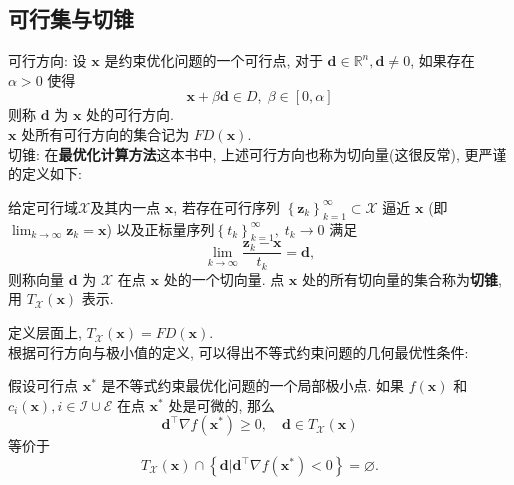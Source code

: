 \documentclass[lang = cn]{elegantpaper}
\begin{document}
\subsection{可行集与切锥}
\noindent
可行方向: 设 $\bm{x}$ 是约束优化问题的一个可行点, 对于 $\bm{d} \in \mathbb{R}^n,\bm{d} \neq 0$, 如果存在 $\alpha > 0$ 使得
\begin{equation*}
    \bm{x} + \beta \bm{d} \in D,\; \beta \in [0,\alpha]
\end{equation*}
则称 $\bm{d}$ 为 $\bm{x}$ 处的可行方向.\\
$\bm{x}$ 处所有可行方向的集合记为 $FD(\bm{x})$.\\
切锥: 在\textbf{最优化计算方法}这本书中, 上述可行方向也称为切向量(这很反常), 更严谨的定义如下:
\begin{definition}
    给定可行域$\mathcal{X}$及其内一点 $\bm{x}$, 若存在可行序列 $\left\{\bm{z}_k\right\}_{k=1}^\infty\subset \mathcal{X}$ 逼近 $\bm{x}$ (即 $\lim_{k \rightarrow \infty} \bm{z}_k = \bm{x}$) 以及正标量序列$\left\{t_k\right\}_{k=1}^\infty,\;t_k \rightarrow 0$ 满足
\begin{equation*}
    \lim_{k \rightarrow \infty} \frac{\bm{z}_k - \bm{x}}{t_k} = \bm{d},
\end{equation*}
    则称向量 $\bm{d}$ 为 $\mathcal{X}$ 在点 $\bm{x}$ 处的一个切向量. 点 $\bm{x}$ 处的所有切向量的集合称为\textbf{切锥}, 用 $T_\mathcal{X}(\bm{x})$ 表示.
\end{definition}
\noindent
定义层面上, $T_\mathcal{X}(\bm{x}) = FD(\bm{x})$.\\
根据可行方向与极小值的定义, 可以得出不等式约束问题的几何最优性条件:
\begin{theorem}
    假设可行点 $\bm{x}^{*}$ 是不等式约束最优化问题的一个局部极小点. 如果 $f(\bm{x})$ 和 $c_i(\bm{x}), i \in \mathcal{I} \cup \mathcal{E}$ 在点 $\bm{x}^{*}$ 处是可微的, 那么
\begin{equation*}
    \bm{d}^\top \nabla f(\bm{x}^{*}) \ge 0,\quad \bm{d} \in T_\mathcal{X}(\bm{x})
\end{equation*}
等价于
\begin{equation*}
    T_\mathcal{X}(\bm{x}) \cap \left\{\bm{d}|\bm{d}^\top \nabla f(\bm{x}^{*}) < 0\right\} = \varnothing .
\end{equation*}
\end{theorem}
\end{document}
